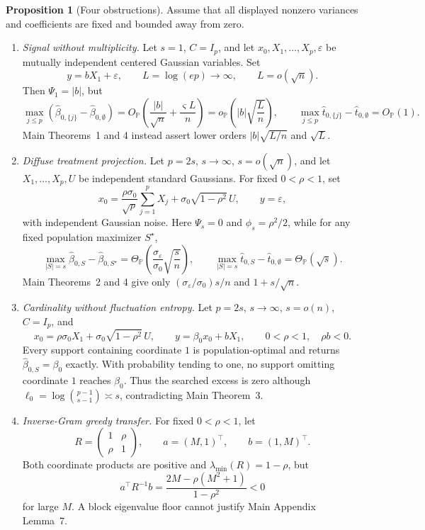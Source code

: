 \documentclass[a4paper,10pt,english]{article}
\theoremstyle{definition}
\newtheorem{proposition}{Proposition}
\newcommand{\Prob}{\mathbb P}
\begin{document}
\begin{proposition}[Four obstructions]\label{prop:obstructions}
Assume that all displayed nonzero variances and coefficients are fixed
and bounded away from zero.
\begin{enumerate}
\item[(i)] \emph{Signal without multiplicity.}
Let $s=1$, $C=I_p$, and let
$x_0,X_1,\ldots,X_p,\varepsilon$ be mutually independent centered
Gaussian variables.  Set
\[
 y=bX_1+\varepsilon,
 \qquad L=\log(ep)\longrightarrow\infty,
 \qquad L=o(\sqrt n).
\]
Then $\Psi_1=|b|$, but
\[
 \max_{j\le p}(\hat\beta_{0,\{j\}}-\hat\beta_{0,\emptyset})
 =O_{\Prob}\left(\frac{|b|}{\sqrt n}
 +\frac{\varsigma L}{n}\right)
 =o_{\Prob}\left(|b|\sqrt{\frac Ln}\right),
 \qquad
 \max_{j\le p}\hat t_{0,\{j\}}-\hat t_{0,\emptyset}=O_{\Prob}(1).
\]
Main Theorems~1 and 4 instead assert lower orders
$|b|\sqrt{L/n}$ and $\sqrt L$.

\item[(ii)] \emph{Diffuse treatment projection.}
Let $p=2s$, $s\to\infty$, $s=o(\sqrt n)$, and let
$X_1,\ldots,X_p,U$ be independent standard Gaussians.  For fixed
$0<\rho<1$, set
\[
 x_0=\frac{\rho\sigma_0}{\sqrt p}\sum_{j=1}^pX_j
 +\sigma_0\sqrt{1-\rho^2}\,U,
 \qquad y=\varepsilon,
\]
with independent Gaussian noise.  Here $\Psi_s=0$ and
$\phi_s=\rho^2/2$, while for any fixed population maximizer $S^\star$,
\[
 \max_{|S|=s}\hat\beta_{0,S}-\hat\beta_{0,S^\star}
 =\Theta_{\Prob}\left(
 \frac{\sigma_\varepsilon}{\sigma_0}\sqrt{\frac sn}\right),
 \qquad
 \max_{|S|=s}\hat t_{0,S}-\hat t_{0,\emptyset}
 =\Theta_{\Prob}(\sqrt s).
\]
Main Theorems~2 and 4 give only
$(\sigma_\varepsilon/\sigma_0)s/n$ and $1+s/\sqrt n$.

\item[(iii)] \emph{Cardinality without fluctuation entropy.}
Let $p=2s$, $s\to\infty$, $s=o(n)$, $C=I_p$, and
\[
 x_0=\rho\sigma_0X_1+\sigma_0\sqrt{1-\rho^2}\,U,
 \qquad y=\beta_0x_0+bX_1,
 \qquad 0<\rho<1,\quad \rho b<0.
\]
Every support containing coordinate $1$ is population-optimal and
returns $\hat\beta_{0,S}=\beta_0$ exactly.  With probability tending to
one, no support omitting coordinate $1$ reaches $\beta_0$.  Thus the
searched excess is zero although
$\ell_0=\log\binom{p-1}{s-1}\asymp s$, contradicting Main Theorem~3.

\item[(iv)] \emph{Inverse-Gram greedy transfer.}
For fixed $0<\rho<1$, let
\[
 R=\begin{pmatrix}1&\rho\\ \rho&1\end{pmatrix},
 \qquad a=(M,1)^\top,
 \qquad b=(1,M)^\top.
\]
Both coordinate products are positive and
$\lambda_{\min}(R)=1-\rho$, but
\[
 a^\top R^{-1}b
 =\frac{2M-\rho(M^2+1)}{1-\rho^2}<0
\]
for large $M$.  A block eigenvalue floor cannot justify Main Appendix
Lemma~7.
\end{enumerate}
\end{proposition}
\end{document}
